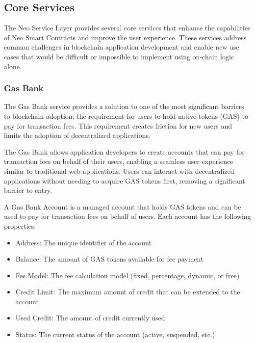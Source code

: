 \subsection{Core Services}
\label{subsec:nsl-core-services}

The Neo Service Layer provides several core services that enhance the capabilities of Neo Smart Contracts and improve the user experience. These services address common challenges in blockchain application development and enable new use cases that would be difficult or impossible to implement using on-chain logic alone.

\subsubsection{Gas Bank}
\label{subsubsec:gas-bank}

The Gas Bank service provides a solution to one of the most significant barriers to blockchain adoption: the requirement for users to hold native tokens (GAS) to pay for transaction fees. This requirement creates friction for new users and limits the adoption of decentralized applications.



The Gas Bank allows application developers to create accounts that can pay for transaction fees on behalf of their users, enabling a seamless user experience similar to traditional web applications. Users can interact with decentralized applications without needing to acquire GAS tokens first, removing a significant barrier to entry.

\begin{definition}
A Gas Bank Account is a managed account that holds GAS tokens and can be used to pay for transaction fees on behalf of users. Each account has the following properties:
\begin{itemize}
    \item Address: The unique identifier of the account
    \item Balance: The amount of GAS tokens available for fee payment
    \item Fee Model: The fee calculation model (fixed, percentage, dynamic, or free)
    \item Credit Limit: The maximum amount of credit that can be extended to the account
    \item Used Credit: The amount of credit currently used
    \item Status: The current status of the account (active, suspended, etc.)
\end{itemize}
\end{definition}

